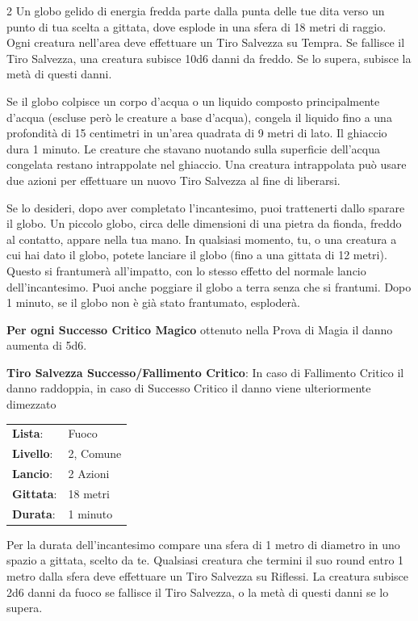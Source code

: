 \begin{multicols}{2}
Un globo gelido di energia fredda parte dalla punta delle tue dita verso un punto di tua scelta a gittata, dove esplode in una sfera di 18 metri di raggio. Ogni creatura nell'area deve effettuare un Tiro Salvezza su Tempra. Se fallisce il Tiro Salvezza, una creatura subisce 10d6 danni da freddo. Se lo supera, subisce la metà di questi danni.

Se il globo colpisce un corpo d'acqua o un liquido composto principalmente d'acqua (escluse però le creature a base d'acqua), congela il liquido fino a una profondità di 15 centimetri in un'area quadrata di 9 metri di lato. Il ghiaccio dura 1 minuto. Le creature che stavano nuotando sulla superficie dell'acqua congelata restano intrappolate nel ghiaccio. Una creatura intrappolata può usare due azioni per effettuare un nuovo Tiro Salvezza al fine di liberarsi.

Se lo desideri, dopo aver completato l'incantesimo, puoi trattenerti dallo sparare il globo. Un piccolo globo, circa delle dimensioni di una pietra da fionda, freddo al contatto, appare nella tua mano. In qualsiasi momento, tu, o una creatura a cui hai dato il globo, potete lanciare il globo (fino a una gittata di 12 metri). Questo si frantumerà all'impatto, con lo stesso effetto del normale lancio dell'incantesimo. Puoi anche poggiare il globo a terra senza che si frantumi. Dopo 1 minuto, se il globo non è già stato frantumato, esploderà.

\textbf{Per ogni Successo Critico Magico} ottenuto nella Prova di Magia il danno aumenta di 5d6.

\textbf{Tiro Salvezza Successo/Fallimento Critico}: In caso di Fallimento Critico il danno raddoppia, in caso di Successo Critico il danno viene ulteriormente dimezzato

\noindent\begin{tabularx}{\linewidth}{p{1.9cm}X}
	\rowcolor{gray!20}\textbf{Lista}: & Fuoco \\
	\textbf{Livello}: & 2, Comune \\
	\rowcolor{gray!20}\textbf{Lancio}: & 2 Azioni \\
	\textbf{Gittata}: & 18 metri \\
	\rowcolor{gray!20}\textbf{Durata}: & 1 minuto \\
\end{tabularx}\smallskip

Per la durata dell'incantesimo compare una sfera di 1 metro di diametro in uno spazio a gittata, scelto da te. Qualsiasi creatura che termini il suo round entro 1 metro dalla sfera deve effettuare un Tiro Salvezza su Riflessi. La creatura subisce 2d6 danni da fuoco se fallisce il Tiro Salvezza, o la metà di questi danni se lo supera.


\end{multicols}
